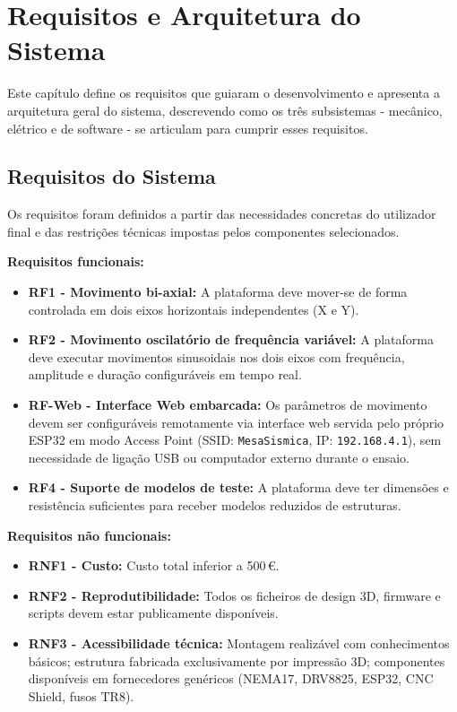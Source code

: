 

\chapter{Requisitos e Arquitetura do Sistema}
\label{chapter:architecture}

\begin{introduction}
Este capítulo define os requisitos que guiaram o desenvolvimento e apresenta a arquitetura geral do sistema, descrevendo como os três subsistemas - mecânico, elétrico e de software - se articulam para cumprir esses requisitos.
\end{introduction}

\section{Requisitos do Sistema}
\label{sec:requisitos}

Os requisitos foram definidos a partir das necessidades concretas do utilizador final e das restrições técnicas impostas pelos componentes selecionados.

\textbf{Requisitos funcionais:}
\begin{itemize}
    \item \textbf{RF1 - Movimento bi-axial:} A plataforma deve mover-se de forma controlada em dois eixos horizontais independentes (X e Y).
    \item \textbf{RF2 - Movimento oscilatório de frequência variável:} A plataforma deve executar movimentos sinusoidais nos dois eixos com frequência, amplitude e duração configuráveis em tempo real.
    \item \textbf{RF-Web - Interface Web embarcada:} Os parâmetros de movimento devem ser configuráveis remotamente via interface web servida pelo próprio ESP32 em modo Access Point (SSID: \texttt{MesaSismica}, IP: \texttt{192.168.4.1}), sem necessidade de ligação USB ou computador externo durante o ensaio.
    \item \textbf{RF4 - Suporte de modelos de teste:} A plataforma deve ter dimensões e resistência suficientes para receber modelos reduzidos de estruturas.
\end{itemize}

\textbf{Requisitos não funcionais:}
\begin{itemize}
    \item \textbf{RNF1 - Custo:} Custo total inferior a 500\,\euro{}.
    \item \textbf{RNF2 - Reprodutibilidade:} Todos os ficheiros de design 3D, firmware e scripts devem estar publicamente disponíveis.
    \item \textbf{RNF3 - Acessibilidade técnica:} Montagem realizável com conhecimentos básicos; estrutura fabricada exclusivamente por impressão 3D; componentes disponíveis em fornecedores genéricos (NEMA17, DRV8825, ESP32, CNC Shield, fusos TR8).
\end{itemize}


